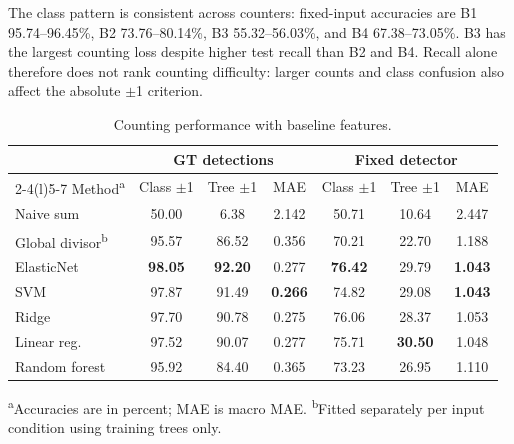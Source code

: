 \documentclass[conference,a4paper]{IEEEtran}
\begin{document}
The class pattern is consistent across counters: fixed-input accuracies are
B1 95.74--96.45\%, B2 73.76--80.14\%, B3 55.32--56.03\%, and B4
67.38--73.05\%. B3 has the largest counting loss despite higher test recall
than B2 and B4. Recall alone therefore does not rank counting difficulty:
larger counts and class confusion also affect the absolute $\pm$1 criterion.

\begin{table}[!tb]
  \centering
  \footnotesize
  \renewcommand{\arraystretch}{1.13}
  \setlength{\tabcolsep}{3pt}
  \caption{Counting performance with baseline features.}
  \label{tab:counting}
  \begin{tabular*}{\columnwidth}{@{\extracolsep{\fill}}lcccccc@{}}
    \toprule
     & \multicolumn{3}{c}{GT detections} & \multicolumn{3}{c}{Fixed detector} \\
    \cmidrule(lr){2-4}\cmidrule(l){5-7}
    Method\textsuperscript{a} & Class $\pm$1 & Tree $\pm$1 & MAE & Class $\pm$1 & Tree $\pm$1 & MAE \\
    \midrule
    Naive sum         & 50.00          & 6.38           & 2.142          & 50.71          & 10.64          & 2.447 \\
    Global divisor\textsuperscript{b} & 95.57          & 86.52          & 0.356          & 70.21          & 22.70          & 1.188 \\
    \addlinespace[2pt]
    ElasticNet        & \textbf{98.05} & \textbf{92.20} & 0.277          & \textbf{76.42} & 29.79          & \textbf{1.043} \\
    SVM               & 97.87          & 91.49          & \textbf{0.266} & 74.82          & 29.08          & \textbf{1.043} \\
    Ridge             & 97.70          & 90.78          & 0.275          & 76.06          & 28.37          & 1.053 \\
    Linear reg. & 97.52          & 90.07          & 0.277          & 75.71          & \textbf{30.50} & 1.048 \\
    Random forest     & 95.92          & 84.40          & 0.365          & 73.23          & 26.95          & 1.110 \\
    \bottomrule
  \end{tabular*}
\par\vspace{1pt}
  \begin{minipage}{\columnwidth}
    \footnotesize\raggedright
    \textsuperscript{a}Accuracies are in percent; MAE is macro MAE. \textsuperscript{b}Fitted separately per input condition using training trees only.
  \end{minipage}
\end{table}
\end{document}
